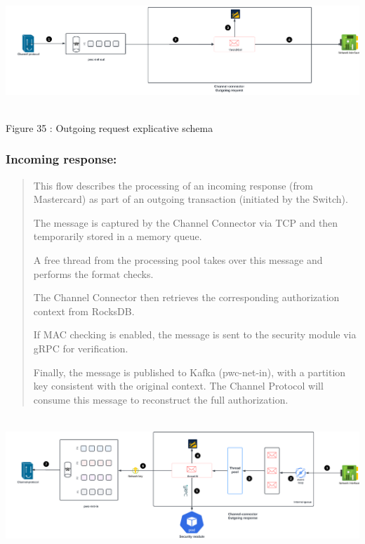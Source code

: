 \documentclass[12pt,a4paper]{report}
\begin{document}
\includegraphics[width=6.78333in,height=1.72048in]{vertopal_d1b0b2209edd4c6aa8254f57daa0953b/media/image54.png}

\protect\hypertarget{_Toc201954511}{}{}Figure 35 : Outgoing request
explicative schema

\hypertarget{incoming-response}{%
\subsubsection{\texorpdfstring{\textbf{Incoming
response:}}{Incoming response:}}\label{incoming-response}}

\begin{quote}
This flow describes the processing of an incoming response (from
Mastercard) as part of an outgoing transaction (initiated by the
Switch).

The message is captured by the Channel Connector via TCP and then
temporarily stored in a memory queue.

A free thread from the processing pool takes over this message and
performs the format checks.

The Channel Connector then retrieves the corresponding authorization
context from RocksDB.

If MAC checking is enabled, the message is sent to the security module
via gRPC for verification.

Finally, the message is published to Kafka (pwc-net-in), with a
partition key consistent with the original context. The Channel Protocol
will consume this message to reconstruct the full authorization.
\end{quote}

\includegraphics[width=6.70029in,height=2.03289in]{vertopal_d1b0b2209edd4c6aa8254f57daa0953b/media/image55.png}
\end{document}
